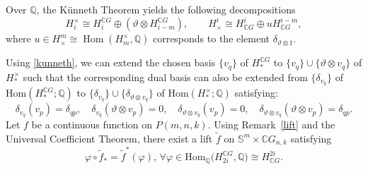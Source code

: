 \documentclass{amsart}
\newcommand{\remref}[1]{Remark~\ref{#1}}
\renewcommand{\hom}{\mathrm{Hom}}
\begin{document}
	Over $\mathbb Q$, the K\"unneth Theorem yields the following decompositions 
	\begin{equation}\label{kunneth}
		H_i^\times \cong H_i^{\mathbb{C}G} \oplus (\vartheta \otimes H_{i-m}^{\mathbb{C}G}), 
		\qquad 
		H^i_\times \cong H^i_{\mathbb{C}G} \oplus uH^{i-m}_{\mathbb{C}G},
	\end{equation}
	where  $u \in H^m_{\times} \cong \operatorname{Hom}(H_m^{\times}, \mathbb Q)$ corresponds to the element $\delta_{\vartheta\otimes 1}$.
	
	
	Using \eqref{kunneth}, we can extend the chosen basis $\{v_q\}$ of $H_*^{\mathbb{C}G}$ to $	\{v_q\} \cup \{\vartheta \otimes v_q\}$ of $H_*^\times$ such that the corresponding dual basis can also be extended from $\{\delta_{v_q}\}$ of $ \hom (H_*^{\mathbb{C}G};\mathbb{Q})$ to $\{\delta_{v_q}\} \cup \{\delta_{\vartheta \otimes v_q}\} $ of $\hom (H_*^{\times};\mathbb{Q})$ satisfying:
	\begin{equation}\label{Kronecker relations}
		\delta_{v_q}( v_p) = \delta_{qp}, \quad
		\delta_{v_q}( \vartheta \otimes v_p)= 0, \quad
		\delta_{\vartheta\otimes v_q}(v_p) = 0, \quad
		\delta_{\vartheta\otimes v_q}(\vartheta \otimes v_p)= \delta_{qp}.
	\end{equation}
	Let $f$ be a continuous function on $P(m,n,k)$. Using \remref{lift} and the Universal Coefficient Theorem, there exist a lift $\tilde{f}$ on $\mathbb{S}^m\times \mathbb{C}G_{n,k}$ satisfying \begin{equation}\label{comm with phi}
		\varphi \circ \tilde{f}_* = \tilde{f}^*(\varphi) , \, \forall
		\varphi \in \hom _{\mathbb Q}\big(H_{2i}^{\mathbb CG}, \mathbb Q\big)\cong H^{2i}_{\mathbb CG}.
	\end{equation}
	
\end{document}
